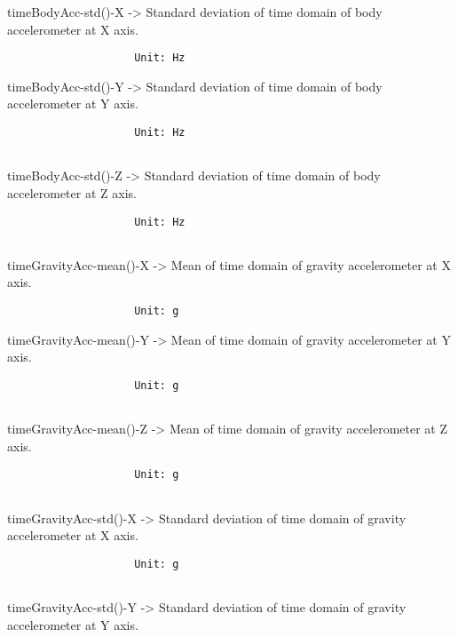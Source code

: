 \documentclass[
]{article}
\begin{document}
timeBodyAcc-std()-X -\textgreater{} Standard deviation of time domain of
body accelerometer at X axis.

\begin{verbatim}
                    Unit: Hz
\end{verbatim}

timeBodyAcc-std()-Y -\textgreater{} Standard deviation of time domain of
body accelerometer at Y axis.

\begin{verbatim}
                    Unit: Hz
                    
\end{verbatim}

timeBodyAcc-std()-Z -\textgreater{} Standard deviation of time domain of
body accelerometer at Z axis.

\begin{verbatim}
                    Unit: Hz
                    
\end{verbatim}

timeGravityAcc-mean()-X -\textgreater{} Mean of time domain of gravity
accelerometer at X axis.

\begin{verbatim}
                    Unit: g
\end{verbatim}

timeGravityAcc-mean()-Y -\textgreater{} Mean of time domain of gravity
accelerometer at Y axis.

\begin{verbatim}
                    Unit: g
                    
\end{verbatim}

timeGravityAcc-mean()-Z -\textgreater{} Mean of time domain of gravity
accelerometer at Z axis.

\begin{verbatim}
                    Unit: g
                    
\end{verbatim}

timeGravityAcc-std()-X -\textgreater{} Standard deviation of time domain
of gravity accelerometer at X axis.

\begin{verbatim}
                    Unit: g
                    
\end{verbatim}

timeGravityAcc-std()-Y -\textgreater{} Standard deviation of time domain
of gravity accelerometer at Y axis.
\end{document}
